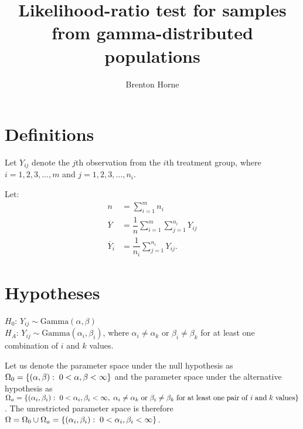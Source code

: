 \documentclass[12pt,a4paper]{article}
\title{Likelihood-ratio test for samples from gamma-distributed populations}
\author{Brenton Horne}
\newcommand{\GamD}{\mathrm{Gamma}}
\begin{document}
	\maketitle
	\tableofcontents
	\newpage
	
	\section{Definitions}
	Let $Y_{ij}$ denote the $j$th observation from the $i$th treatment group, where $i=1, 2, 3, ..., m$ and $j=1, 2, 3, ..., n_i$. 
	
	Let:
	\begin{align*}
		n &= \sum_{i=1}^m n_i \\
		\overline{Y} &= \dfrac{1}{n} \sum_{i=1}^m \sum_{j=1}^{n_i} Y_{ij} \\
		\overline{Y}_i &= \dfrac{1}{n_i} \sum_{j=1}^{n_i} Y_{ij}.
	\end{align*}
	
	\section{Hypotheses}
	$H_0$: $Y_{ij} \sim \GamD(\alpha, \beta)$ \\
	$H_A$: $Y_{ij} \sim \GamD(\alpha_i, \beta_i)$, where $\alpha_i \neq \alpha_k$ or $\beta_i \neq \beta_k$ for at least one combination of $i$ and $k$ values. 
	
	Let us denote the parameter space under the null hypothesis as $\Omega_0 = \left\{(\alpha, \beta): \hspace{0.1cm} 0 < \alpha, \beta < \infty\right\}$ and the parameter space under the alternative hypothesis as \\$\Omega_a = \left\{(\alpha_i, \beta_i): \hspace{0.1cm} 0 < \alpha_i, \beta_i < \infty,\hspace{0.1cm}\alpha_i \neq \alpha_k \hspace{0.1cm} \mathrm{or}\hspace{0.1cm}\beta_i \neq \beta_k \hspace{0.1cm}\mathrm{for}\hspace{0.1cm}\mathrm{at}\hspace{0.1cm}\mathrm{least}\hspace{0.1cm}\mathrm{one}\hspace{0.1cm}\mathrm{pair}\hspace{0.1cm}\mathrm{of}\hspace{0.1cm}i\hspace{0.1cm}\mathrm{and}\hspace{0.1cm}k \hspace{0.1cm}\mathrm{values}\right\}$. The unrestricted parameter space is therefore $\Omega = \Omega_0 \cup \Omega_a = \left\{(\alpha_i, \beta_i): \hspace{0.1cm} 0 < \alpha_i, \beta_i < \infty\right\}$. 
	
\end{document}
